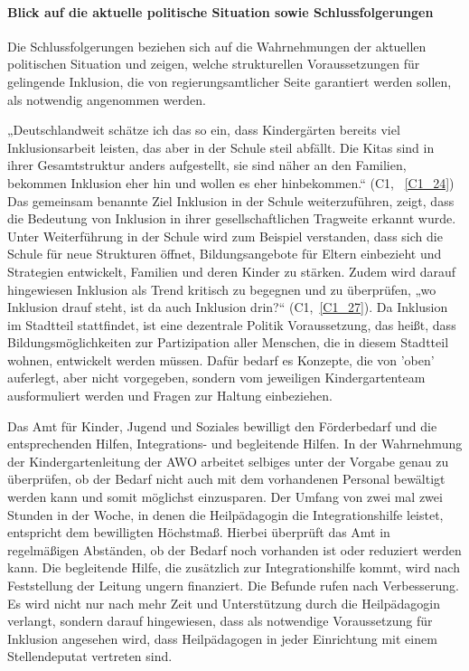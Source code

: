 \paragraph{Blick auf die aktuelle politische Situation sowie Schlussfolgerungen}

Die Schlussfolgerungen beziehen sich auf die Wahrnehmungen der aktuellen politischen Situation und zeigen, welche strukturellen Voraussetzungen für gelingende Inklusion, die von regierungsamtlicher Seite garantiert werden sollen, als notwendig angenommen werden.
 
„Deutschlandweit schätze ich das so ein, dass Kindergärten bereits viel Inklusionsarbeit leisten, das aber in der Schule steil abfällt. Die Kitas sind in ihrer Gesamtstruktur anders aufgestellt, sie sind näher an den Familien, bekommen Inklusion eher hin und wollen es eher hinbekommen.“ (C1, ~\ref{C1_24}) Das gemeinsam benannte Ziel Inklusion in der Schule weiterzuführen, zeigt, dass die Bedeutung von Inklusion in ihrer gesellschaftlichen Tragweite erkannt wurde. Unter Weiterführung in der Schule wird zum Beispiel verstanden, dass sich die Schule für neue Strukturen öffnet, Bildungsangebote für Eltern einbezieht und Strategien entwickelt, Familien und deren Kinder zu stärken. Zudem wird darauf hingewiesen Inklusion als Trend kritisch zu begegnen und zu überprüfen, „wo Inklusion drauf steht, ist da auch Inklusion drin?“ (C1,~\ref{C1_27}). 
Da Inklusion im Stadtteil stattfindet, ist eine dezentrale Politik Voraussetzung, das heißt, dass Bildungsmöglichkeiten zur Partizipation aller Menschen, die in diesem Stadtteil wohnen, entwickelt werden müssen. Dafür bedarf es Konzepte, die von 'oben' auferlegt, aber nicht vorgegeben, sondern vom jeweiligen Kindergartenteam ausformuliert werden und Fragen zur Haltung einbeziehen.

Das Amt für Kinder, Jugend und Soziales bewilligt den Förderbedarf und die entsprechenden Hilfen, Integrations- und begleitende Hilfen. In der Wahrnehmung der Kindergartenleitung der AWO arbeitet selbiges unter der Vorgabe genau zu überprüfen, ob der Bedarf nicht auch mit dem vorhandenen Personal bewältigt werden kann und somit möglichst ein\-zusparen. Der Umfang von zwei mal zwei Stunden in der Woche, in denen die Heilpädagogin die Integrationshilfe leistet, entspricht dem  bewilligten Höchstmaß. Hierbei überprüft das Amt in regelmäßigen Abständen, ob der Bedarf noch vorhanden ist oder reduziert werden kann. Die begleitende Hilfe, die zusätzlich zur Integrationshilfe kommt, wird nach Feststellung der Leitung ungern finanziert. Die Befunde rufen nach Verbesserung. Es wird nicht nur nach mehr Zeit und Unterstützung durch die Heilpädagogin verlangt, sondern darauf hingewiesen, dass als notwendige Voraussetzung für Inklusion angesehen wird, dass Heilpädagogen in jeder Einrichtung mit einem Stellendeputat vertreten sind. 

